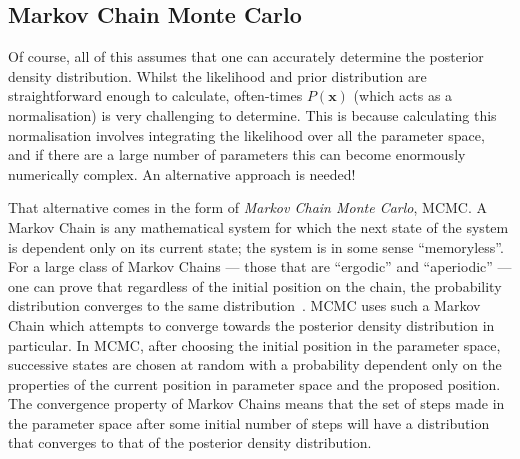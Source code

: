 \subsection{Markov Chain Monte Carlo}
Of course, all of this assumes that one can accurately determine the posterior density distribution. Whilst the likelihood and prior distribution are straightforward enough to calculate, often-times $P\left(\bm{x}\right)$ (which acts as a normalisation) is very challenging to determine. This is because calculating this normalisation involves integrating the likelihood over all the parameter space, and if there are a large number of parameters this can become enormously numerically complex. An alternative approach is needed!

That alternative comes in the form of \textit{Markov Chain Monte Carlo}, MCMC. A Markov Chain is any mathematical system for which the next state of the system is dependent only on its current state; the system is in some sense ``memoryless''. For a large class of Markov Chains --- those that are ``ergodic'' and ``aperiodic'' --- one can prove that regardless of the initial position on the chain, the probability distribution converges to the same distribution~\cite{}. %
MCMC uses such a Markov Chain which attempts to converge towards the posterior density distribution in particular. In MCMC, after choosing the initial position in the parameter space, successive states are chosen at random with a probability dependent only on the properties of the current position in parameter space and the proposed position. The convergence property of Markov Chains means that the set of steps made in the parameter space after some initial number of steps will have a distribution that converges to that of the posterior density distribution.

